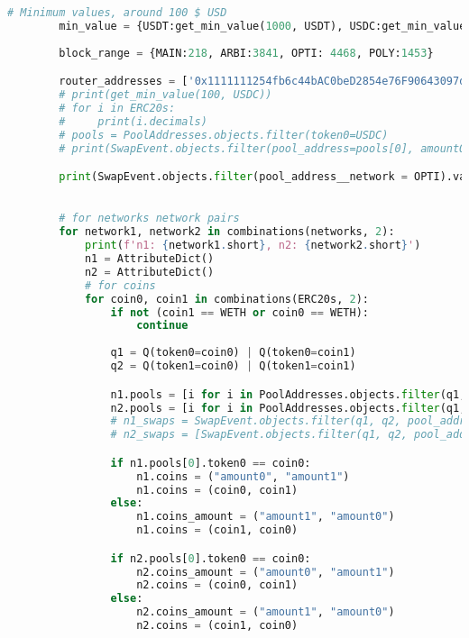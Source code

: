 \begin{lstlisting}[language=python]
        # Minimum values, around 100 $ USD
        min_value = {USDT:get_min_value(1000, USDT), USDC:get_min_value(1000, USDC), DAI:get_min_value(1000, DAI), WETH:get_min_value(1, WETH), WBTC:get_min_value(0.05, WBTC)}
        
        block_range = {MAIN:218, ARBI:3841, OPTI: 4468, POLY:1453}

        router_addresses = ['0x1111111254fb6c44bAC0beD2854e76F90643097d', '0xE592427A0AEce92De3Edee1F18E0157C05861564', '0x68b3465833fb72A70ecDF485E0e4C7bD8665Fc45']
        # print(get_min_value(100, USDC))
        # for i in ERC20s:
        #     print(i.decimals)
        # pools = PoolAddresses.objects.filter(token0=USDC)
        # print(SwapEvent.objects.filter(pool_address=pools[0], amount0__gte=min_value[USDC]).count())

        print(SwapEvent.objects.filter(pool_address__network = OPTI).values('recipient').distinct().count())   

        
        # for networks network pairs
        for network1, network2 in combinations(networks, 2):
            print(f'n1: {network1.short}, n2: {network2.short}')
            n1 = AttributeDict()
            n2 = AttributeDict()
            # for coins
            for coin0, coin1 in combinations(ERC20s, 2):
                if not (coin1 == WETH or coin0 == WETH):
                    continue
                
                q1 = Q(token0=coin0) | Q(token0=coin1)
                q2 = Q(token1=coin0) | Q(token1=coin1)

                n1.pools = [i for i in PoolAddresses.objects.filter(q1, q2, network=network1)]
                n2.pools = [i for i in PoolAddresses.objects.filter(q1, q2, network=network2)]
                # n1_swaps = SwapEvent.objects.filter(q1, q2, pool_address__network=network1)
                # n2_swaps = [SwapEvent.objects.filter(q1, q2, pool_address__network=network2).first()]

                if n1.pools[0].token0 == coin0:
                    n1.coins = ("amount0", "amount1")
                    n1.coins = (coin0, coin1)
                else:
                    n1.coins_amount = ("amount1", "amount0")
                    n1.coins = (coin1, coin0)

                if n2.pools[0].token0 == coin0:
                    n2.coins_amount = ("amount0", "amount1")
                    n2.coins = (coin0, coin1)
                else:
                    n2.coins_amount = ("amount1", "amount0")
                    n2.coins = (coin1, coin0)


\end{lstlisting}
